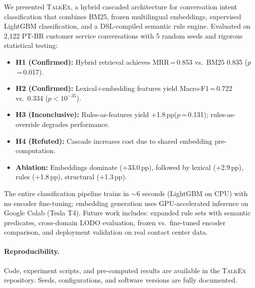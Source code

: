 \documentclass[11pt]{article}
\newcommand{\talkex}{\textsc{TalkEx}}
\newcommand{\macrof}{Macro-F1}
\newcommand{\pp}{\,pp}
\begin{document}
We presented \talkex{}, a hybrid cascaded architecture for conversation intent classification that combines BM25, frozen multilingual embeddings, supervised LightGBM classification, and a DSL-compiled semantic rule engine. Evaluated on 2,122 PT-BR customer service conversations with 5 random seeds and rigorous statistical testing:

\begin{itemize}[leftmargin=*,itemsep=2pt]
    \item \textbf{H1 (Confirmed):} Hybrid retrieval achieves MRR\,=\,0.853 vs.\ BM25 0.835 ($p$\,=\,0.017).
    \item \textbf{H2 (Confirmed):} Lexical+embedding features yield \macrof{}\,=\,0.722 vs.\ 0.334 ($p < 10^{-35}$).
    \item \textbf{H3 (Inconclusive):} Rules-as-features yield $+$1.8\pp ($p$\,=\,0.131); rules-as-override degrades performance.
    \item \textbf{H4 (Refuted):} Cascade increases cost due to shared embedding pre-computation.
    \item \textbf{Ablation:} Embeddings dominate ($+$33.0\pp), followed by lexical ($+$2.9\pp), rules ($+$1.8\pp), structural ($+$1.3\pp).
\end{itemize}

The entire classification pipeline trains in $\sim$6 seconds (LightGBM on CPU) with no encoder fine-tuning; embedding generation uses GPU-accelerated inference on Google Colab (Tesla T4). Future work includes: expanded rule sets with semantic predicates, cross-domain LODO evaluation, frozen vs.\ fine-tuned encoder comparison, and deployment validation on real contact center data.

\paragraph{Reproducibility.} Code, experiment scripts, and pre-computed results are available in the \talkex{} repository. Seeds, configurations, and software versions are fully documented.
\end{document}
